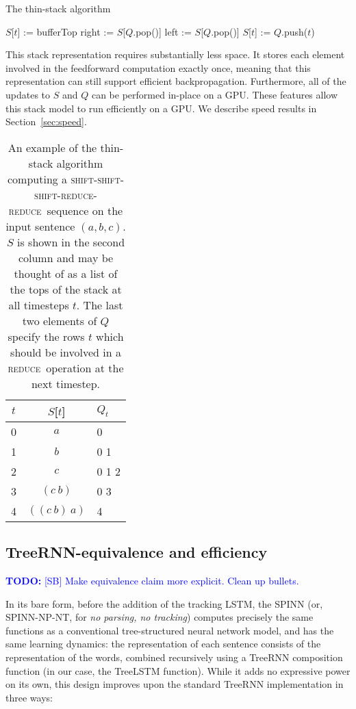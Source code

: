 \documentclass[11pt]{article}
\newcommand\todo[1]{\textcolor{blue}{\textbf{TODO:} #1}}
\newcommand{\shift}{\textsc{shift}}
\newcommand{\reduce}{\textsc{reduce}}
\begin{document}
\begin{algorithm}
\caption{The thin-stack algorithm}
\label{alg:thin-stack}
\begin{algorithmic}[1]
    \If{op = \shift}
      \State $S$[$t$] := bufferTop
    \ElsIf{op = \reduce}
      \State right := $S$[$Q$.pop()]
      \State left := $S$[$Q$.pop()]
      \State $S$[$t$] := 
    \EndIf
    \State $Q$.push($t$)
  \EndFunction
\end{algorithmic}
\end{algorithm}

This stack representation requires substantially less space. It stores each element involved in the feedforward computation exactly once, meaning that this representation can still support efficient backpropagation. Furthermore, all of the updates to $S$ and $Q$ can be performed in-place on a GPU. These features allow this stack model to run efficiently on a GPU. We describe speed results in Section~\ref{sec:speed}.

\begin{table}
\centering
\begin{tabular}{c|cl}
  \toprule
  $t$ & $S$[$t$] & $Q_t$ \\
  \midrule
  0 & $a$ & 0 \\
  1 & $b$ & 0 1 \\
  2 & $c$ & 0 1 2 \\
  3 & $(c~b)$ & 0 3 \\
  4 & $((c~b)~a)$ & 4 \\
  \bottomrule
\end{tabular}
\caption{An example of the thin-stack algorithm computing a \shift-\shift-\shift-\reduce-\reduce~sequence on the input sentence $(a, b, c)$. $S$ is shown in the second column and may be thought of as a list of the tops of the stack at all timesteps $t$. The last two elements of $Q$ specify the rows $t$ which should be involved in a \reduce~operation at the next timestep.}
\label{tbl:thin-stack}
\end{table}

\subsection{TreeRNN-equivalence and efficiency}

\todo{[SB] Make equivalence claim more explicit. Clean up bullets.}

In its bare form, before the addition of the tracking LSTM, the SPINN (or, SPINN-NP-NT, for \textit{no parsing, no tracking}) computes precisely the same functions as a conventional tree-structured neural network model, and has the same learning dynamics: the representation of each sentence consists of the representation of the words, combined recursively using a TreeRNN composition function (in our case, the TreeLSTM function). While it adds no expressive power on its own, this design improves upon the standard TreeRNN implementation in three ways:
\end{document}
